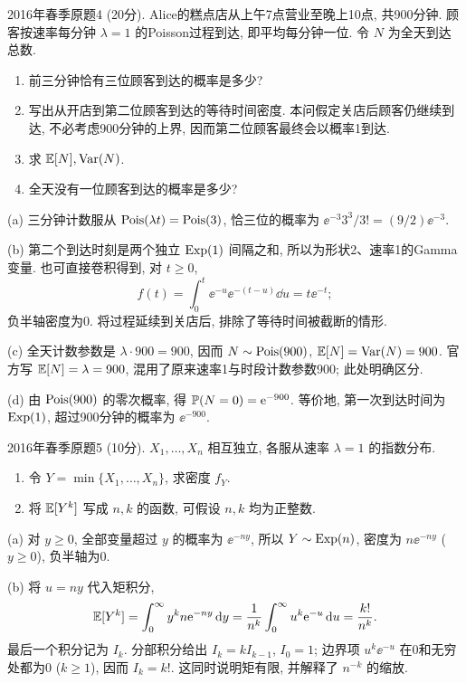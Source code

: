 \begin{exercise}\label{m2:2016s:q4}
2016年春季原题4 (20分). Alice的糕点店从上午7点营业至晚上10点, 共900分钟. 顾客按速率每分钟 $\lambda=1$ 的Poisson过程到达, 即平均每分钟一位. 令 $N$ 为全天到达总数.
\begin{enumerate}
\item[(a)]\label{m2:2016s:q4:a} 前三分钟恰有三位顾客到达的概率是多少?
\item[(b)]\label{m2:2016s:q4:b} 写出从开店到第二位顾客到达的等待时间密度. 本问假定关店后顾客仍继续到达, 不必考虑900分钟的上界, 因而第二位顾客最终会以概率1到达.
\item[(c)]\label{m2:2016s:q4:c} 求 $\mathbb E[N],\operatorname{Var}(N)$.
\item[(d)]\label{m2:2016s:q4:d} 全天没有一位顾客到达的概率是多少?
\end{enumerate}
\end{exercise}
\begin{solution}
(a) 三分钟计数服从 $\operatorname{Pois}(\lambda t)=\operatorname{Pois}(3)$, 恰三位的概率为 $\ee^{-3}3^3/3!=(9/2)\ee^{-3}$.

(b) 第二个到达时刻是两个独立 $\operatorname{Exp}(1)$ 间隔之和, 所以为形状2、速率1的Gamma变量. 也可直接卷积得到, 对 $t\ge0$,
\[
f(t)=\int_0^t\ee^{-u}\ee^{-(t-u)}\dd u=t\ee^{-t};
\]
负半轴密度为0. 将过程延续到关店后, 排除了等待时间被截断的情形.

(c) 全天计数参数是 $\lambda\cdot900=900$, 因而 $N\sim\operatorname{Pois}(900)$, $\mathbb E[N]=\operatorname{Var}(N)=900$. 官方写 $\mathbb E[N]=\lambda=900$, 混用了原来速率1与时段计数参数900; 此处明确区分.

(d) 由 $\operatorname{Pois}(900)$ 的零次概率, 得 $\mathbb P(N=0)=\mathrm e^{-900}$. 等价地, 第一次到达时间为 $\operatorname{Exp}(1)$, 超过900分钟的概率为 $\ee^{-900}$.
\end{solution}

\begin{exercise}\label{m2:2016s:q5}
2016年春季原题5 (10分). $X_1,\ldots,X_n$ 相互独立, 各服从速率 $\lambda=1$ 的指数分布.
\begin{enumerate}
\item[(a)]\label{m2:2016s:q5:a} 令 $Y=\min\{X_1,\ldots,X_n\}$, 求密度 $f_Y$.
\item[(b)]\label{m2:2016s:q5:b} 将 $\mathbb E[Y^k]$ 写成 $n,k$ 的函数, 可假设 $n,k$ 均为正整数.
\end{enumerate}
\end{exercise}
\begin{solution}
(a) 对 $y\ge0$, 全部变量超过 $y$ 的概率为 $\ee^{-ny}$, 所以 $Y\sim\operatorname{Exp}(n)$, 密度为 $n\ee^{-ny}$ ($y\ge0$), 负半轴为0.

(b) 将 $u=ny$ 代入矩积分,
\[
\mathbb E[Y^k]=\int_0^\infty y^k n\mathrm e^{-ny}\,\mathrm d y=\frac1{n^k}\int_0^\infty u^k\mathrm e^{-u}\,\mathrm d u=\frac{k!}{n^k}.
\]
最后一个积分记为 $I_k$. 分部积分给出 $I_k=kI_{k-1}$, $I_0=1$; 边界项 $u^k\ee^{-u}$ 在0和无穷处都为0 ($k\ge1$), 因而 $I_k=k!$. 这同时说明矩有限, 并解释了 $n^{-k}$ 的缩放.
\end{solution}

